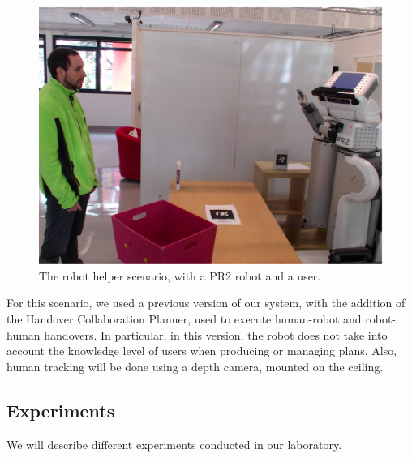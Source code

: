  \begin{figure}[ht!]
 	\centering
 	\includegraphics[scale=0.45]{img/case_study/helper/experiment.pdf}
 	\caption{The robot helper scenario, with a PR2 robot and a user.}
 	\label{fig:case_study-helper-pr2helper}
 \end{figure}

For this scenario, we used a previous version of our system, with the addition of the Handover Collaboration Planner, used to execute human-robot and robot-human handovers. In particular, in this version, the robot does not take into account the knowledge level of users when producing or managing plans. Also, human tracking will be done using a depth camera, mounted on the ceiling.



\subsection{Experiments}
\label{subsec:case_study-helper-experiments}
We will describe different experiments conducted in our laboratory.

